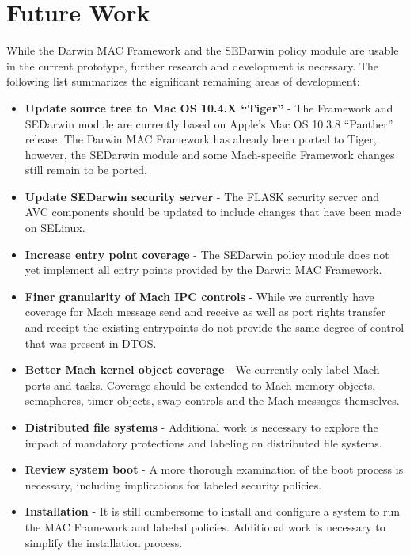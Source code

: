 \section{Future Work}

While the Darwin MAC Framework and the SEDarwin policy module are
usable in the current prototype, further research and development
is necessary.  The following list summarizes the significant remaining
areas of development:

\begin{itemize}

\item {\bf Update source tree to Mac OS 10.4.X ``Tiger''} - The Framework and
SEDarwin module are currently based on Apple's Mac OS 10.3.8 ``Panther''
release.  The Darwin MAC Framework has already been ported to Tiger,
however, the SEDarwin module and some Mach-specific Framework changes
still remain to be ported.

\item {\bf Update SEDarwin security server} - The FLASK security
server and AVC components should be updated to include changes that
have been made on SELinux.

\item {\bf Increase entry point coverage} - The SEDarwin policy module
does not yet implement all entry points provided by the Darwin MAC
Framework.

\item {\bf Finer granularity of Mach IPC controls} - While we currently
have coverage for Mach message send and receive as well as port
rights transfer and receipt the existing entrypoints do not provide
the same degree of control that was present in DTOS.

\item {\bf Better Mach kernel object coverage} - We currently only
label Mach ports and tasks.  Coverage should be extended to Mach
memory objects, semaphores, timer objects, swap controls and the
Mach messages themselves.

\item {\bf Distributed file systems} - Additional work is necessary to
explore the impact of mandatory protections and labeling on
distributed file systems.

\item {\bf Review system boot} - A more thorough examination of the
boot process is necessary, including implications for labeled security
policies.

\item {\bf Installation} - It is still cumbersome to install and
configure a system to run the MAC Framework and labeled policies.
Additional work is necessary to simplify the installation process.


\end{itemize}
